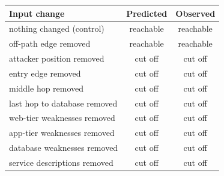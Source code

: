 \begin{tabular}{lcc}
\toprule
Input change & Predicted & Observed \\
\midrule
nothing changed (control) & reachable & reachable \\
off-path edge removed & reachable & reachable \\
attacker position removed & cut off & cut off \\
entry edge removed & cut off & cut off \\
middle hop removed & cut off & cut off \\
last hop to database removed & cut off & cut off \\
web-tier weaknesses removed & cut off & cut off \\
app-tier weaknesses removed & cut off & cut off \\
database weaknesses removed & cut off & cut off \\
service descriptions removed & cut off & cut off \\
\bottomrule
\end{tabular}